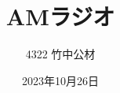 \documentclass[11pt,dvipdfmx]{jarticle}
\begin{document}
\title{AMラジオ}
\author{4322 竹中公材}
\date{2023年10月26日}
\maketitle











\renewcommand{\refname}{参考文献}


\end{document}
